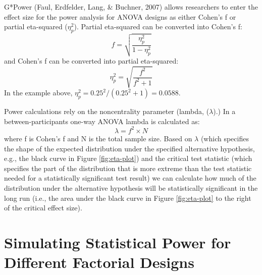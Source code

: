 \documentclass[
  ,jou,floatsintext]{apa6}
\begin{document}
G*Power (Faul, Erdfelder, Lang, \& Buchner, 2007) allows researchers to enter the effect size for the power analysis for ANOVA designs as either Cohen's f or partial eta-squared (\(\eta_p^2\)).
Partial eta-squared can be converted into Cohen's f:
\begin{equation}
f = \sqrt{\frac{\eta_p^2}{1-\eta_p^2}} \label{eq:eta-to-f}
\end{equation}
and Cohen's f can be converted into partial eta-squared:
\begin{equation}
\eta_p^2 = \sqrt{\frac{f^2}{f^2+1}} \label{eq:f-to-eta}
\end{equation}
In the example above, \(\eta_p^2 = 0.25^2/(0.25^2+1) = 0.0588\).

Power calculations rely on the noncentrality parameter (lambda, (\(\lambda\)).)
In a between-participants one-way ANOVA lambda is calculated as:
\begin{equation}
\lambda = f^2 \times N \label{eq:lambda}
\end{equation}
where f is Cohen's f and N is the total sample size.
Based on \(\lambda\) (which specifies the shape of the expected distribution under the specified alternative hypothesis, e.g., the black curve in Figure \ref{fig:eta-plot}) and the critical test statistic (which specifies the part of the distribution that is more extreme than the test statistic needed for a statistically significant test result) we can calculate how much of the distribution under the alternative hypothesis will be statistically significant in the long run (i.e., the area under the black curve in Figure \ref{fig:eta-plot} to the right of the critical effect size).

\hypertarget{simulating-statistical-power-for-different-factorial-designs}{%
\section{Simulating Statistical Power for Different Factorial Designs}\label{simulating-statistical-power-for-different-factorial-designs}}
\end{document}
